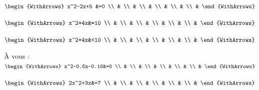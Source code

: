 \documentclass[main.tex]{subfiles}
\begin{document}
\begin{example}
\noindent
\parbox{0.33\linewidth}{
	\noindent
	$\begin{WithArrows}
		x^2-2x+5 &=0 \\
		&  \\
		&  \\
		&  \\
		&  \\
		& \\
		& 
	\end{WithArrows}$
}  
\parbox{0.33\linewidth}{
	\noindent
	$\begin{WithArrows}
		x^2+4x&=10 \\
		&  \\
		&  \\
		& \\
		&  \\
		&  \\
		& 
	\end{WithArrows}$
} 	
\hfill 
\parbox{0.25\linewidth}{
\noindent
$\begin{WithArrows}
	x^2+4x&<10 \\
	&  \\
	&  \\
	& \\
	&  \\
	&  \\
	& 
\end{WithArrows}$
} 	
\vfill  	 

\noindent
\parbox{0.5\linewidth}{
	\noindent  À vous : 
	$\begin{WithArrows}
		x^2-0.6x-0.16&=0 \\
		&  \\
		&  \\
		& \\
		&  \\
		&  \\
		& 
	\end{WithArrows}$
} 	 
\parbox{0.45\linewidth}{
	\noindent
	$\begin{WithArrows}
		2x^2+3x&=7 \\
		&  \\
		&  \\
		& \\
		&  \\
		&  \\
		& 
	\end{WithArrows}$
} 

\vfill 
\end{example}
\end{document}
